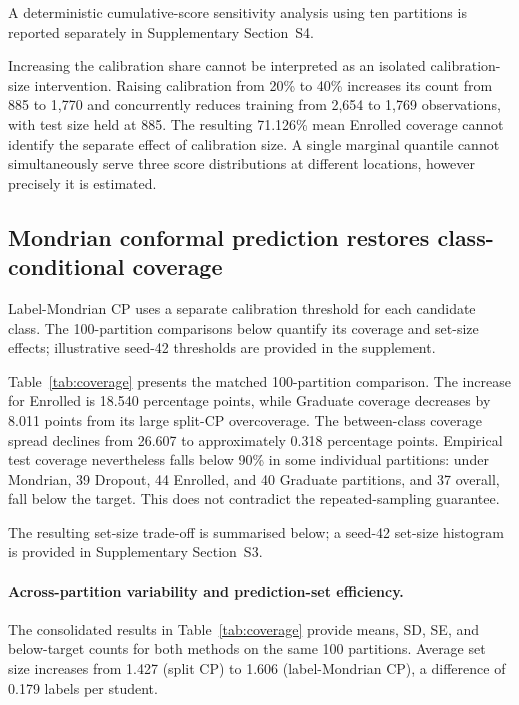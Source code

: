 A deterministic cumulative-score sensitivity analysis using ten partitions
is reported separately in Supplementary Section~S4.

Increasing the calibration share cannot be interpreted as an isolated
calibration-size intervention. Raising calibration from 20\% to 40\% increases its count
from 885 to 1,770 and concurrently reduces training from 2,654 to 1,769
observations, with test size held at 885. The resulting 71.126\% mean Enrolled
coverage cannot identify the separate effect of calibration size. A single marginal quantile cannot simultaneously
serve three score distributions at different locations, however precisely it is
estimated.

\subsection{Mondrian conformal prediction restores class-conditional coverage}

Label-Mondrian CP uses a separate calibration threshold for each candidate
class. The 100-partition comparisons below quantify its coverage and
set-size effects; illustrative seed-42 thresholds are provided in the
supplement.



Table~\ref{tab:coverage} presents the matched 100-partition
comparison. The increase for \textsf{Enrolled} is 18.540 percentage points,
while \textsf{Graduate} coverage decreases by 8.011 points from its large
split-CP overcoverage. The between-class coverage spread declines from
26.607 to approximately 0.318 percentage points. Empirical test coverage
nevertheless falls below 90\% in some individual partitions: under Mondrian,
39 Dropout, 44 Enrolled, and 40 Graduate partitions, and 37 overall, fall
below the target. This does not contradict the repeated-sampling guarantee.

The resulting set-size trade-off is summarised below; a seed-42
set-size histogram is provided in Supplementary Section~S3.



\paragraph{Across-partition variability and prediction-set efficiency.}
The consolidated results in Table~\ref{tab:coverage} provide means, SD,
SE, and below-target counts for both methods on the same 100 partitions.
Average set size increases from 1.427 (split CP) to 1.606
(label-Mondrian CP), a difference of 0.179 labels per student.

